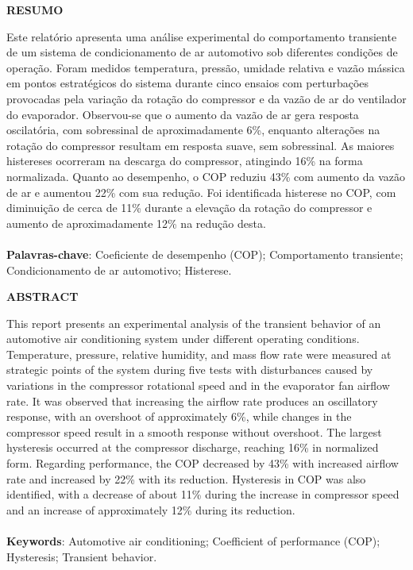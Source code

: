 \onehalfspacing  %
\begin{center}
    \textbf{RESUMO}
\end{center}

{\noindent Este relatório apresenta uma análise experimental do comportamento transiente de um sistema de condicionamento de ar automotivo sob diferentes condições de operação. Foram medidos temperatura, pressão, umidade relativa e vazão mássica em pontos estratégicos do sistema durante cinco ensaios com perturbações provocadas pela variação da rotação do compressor e da vazão de ar do ventilador do evaporador. Observou-se que o aumento da vazão de ar gera resposta oscilatória, com sobressinal de aproximadamente 6\%, enquanto alterações na rotação do compressor resultam em resposta suave, sem sobressinal. As maiores histereses ocorreram na descarga do compressor, atingindo 16\% na forma normalizada. Quanto ao desempenho, o COP reduziu 43\% com aumento da vazão de ar e aumentou 22\% com sua redução. Foi identificada histerese no COP, com diminuição de cerca de 11\% durante a elevação da rotação do compressor e aumento de aproximadamente 12\% na redução desta.
\\\\
\noindent \textbf{Palavras-chave}: Coeficiente de desempenho (COP); Comportamento transiente; Condicionamento de ar automotivo; Histerese. 
}
\newpage

\begin{center}
    \textbf{ABSTRACT}
\end{center}

{\noindent This report presents an experimental analysis of the transient behavior of an automotive air conditioning system under different operating conditions. Temperature, pressure, relative humidity, and mass flow rate were measured at strategic points of the system during five tests with disturbances caused by variations in the compressor rotational speed and in the evaporator fan airflow rate. It was observed that increasing the airflow rate produces an oscillatory response, with an overshoot of approximately 6\%, while changes in the compressor speed result in a smooth response without overshoot. The largest hysteresis occurred at the compressor discharge, reaching 16\% in normalized form. Regarding performance, the COP decreased by 43\% with increased airflow rate and increased by 22\% with its reduction. Hysteresis in COP was also identified, with a decrease of about 11\% during the increase in compressor speed and an increase of approximately 12\% during its reduction.
\\\\
\noindent \textbf{Keywords}: Automotive air conditioning; Coefficient of performance (COP); Hysteresis; Transient behavior.
}

\onehalfspacing